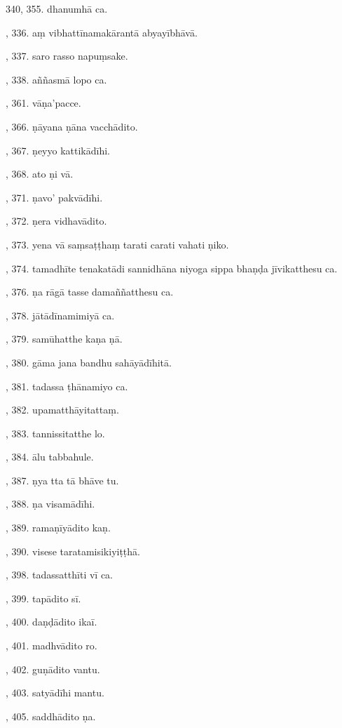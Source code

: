 340, 355. dhanumhā ca.\par {}, 336. aṃ vibhattīnamakārantā abyayībhāvā.\par {}, 337. saro rasso napuṃsake.\par {}, 338. aññasmā lopo ca.\par {}, 361. vāṇa’pacce.\par {}, 366. ṇāyana ṇāna vacchādito.\par {}, 367. ṇeyyo kattikādīhi.\par {}, 368. ato ṇi vā.\par {}, 371. ṇavo’ pakvādīhi.\par {}, 372. ṇera vidhavādito.\par {}, 373. yena vā saṃsaṭṭhaṃ tarati carati vahati ṇiko.\par {}, 374. tamadhīte tenakatādi sannidhāna niyoga sippa bhaṇḍa jīvikatthesu ca.\par {}, 376. ṇa rāgā tasse damaññatthesu ca.\par {}, 378. jātādīnamimiyā ca.\par {}, 379. samūhatthe kaṇa ṇā.\par {}, 380. gāma jana bandhu sahāyādīhitā.\par {}, 381. tadassa ṭhānamiyo ca.\par {}, 382. upamatthāyitattaṃ.\par {}, 383. tannissitatthe lo.\par {}, 384. ālu tabbahule.\par {}, 387. ṇya tta tā bhāve tu.\par {}, 388. ṇa visamādīhi.\par {}, 389. ramaṇīyādito kaṇ.\par {}, 390. visese taratamisikiyiṭṭhā.\par {}, 398. tadassatthīti vī ca.\par {}, 399. tapādito sī.\par {}, 400. daṇḍādito ikaī.\par {}, 401. madhvādito ro.\par {}, 402. guṇādito vantu.\par {}, 403. satyādīhi mantu.\par {}, 405. saddhādito ṇa.\par \noindent
